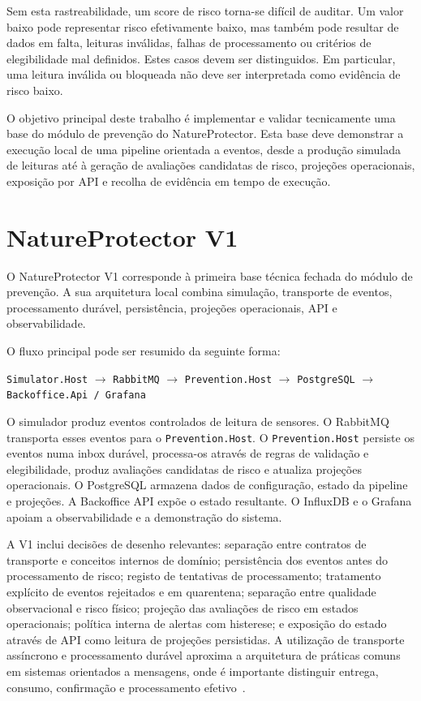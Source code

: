 Sem esta rastreabilidade, um score de risco torna-se difícil de auditar. Um valor baixo pode representar risco efetivamente baixo, mas também pode resultar de dados em falta, leituras inválidas, falhas de processamento ou critérios de elegibilidade mal definidos. Estes casos devem ser distinguidos. Em particular, uma leitura inválida ou bloqueada não deve ser interpretada como evidência de risco baixo.

O objetivo principal deste trabalho é implementar e validar tecnicamente uma base do módulo de prevenção do NatureProtector. Esta base deve demonstrar a execução local de uma pipeline orientada a eventos, desde a produção simulada de leituras até à geração de avaliações candidatas de risco, projeções operacionais, exposição por API e recolha de evidência em tempo de execução.

\section{NatureProtector V1}

O NatureProtector V1 corresponde à primeira base técnica fechada do módulo de prevenção. A sua arquitetura local combina simulação, transporte de eventos, processamento durável, persistência, projeções operacionais, API e observabilidade.

O fluxo principal pode ser resumido da seguinte forma:

\begin{center}
\texttt{Simulator.Host} $\rightarrow$ \texttt{RabbitMQ} $\rightarrow$ \texttt{Prevention.Host} $\rightarrow$ \texttt{PostgreSQL} $\rightarrow$ \texttt{Backoffice.Api / Grafana}
\end{center}

O simulador produz eventos controlados de leitura de sensores. O RabbitMQ transporta esses eventos para o \texttt{Prevention.Host}. O \texttt{Prevention.Host} persiste os eventos numa inbox durável, processa-os através de regras de validação e elegibilidade, produz avaliações candidatas de risco e atualiza projeções operacionais. O PostgreSQL armazena dados de configuração, estado da pipeline e projeções. A Backoffice API expõe o estado resultante. O InfluxDB e o Grafana apoiam a observabilidade e a demonstração do sistema.

A V1 inclui decisões de desenho relevantes: separação entre contratos de transporte e conceitos internos de domínio; persistência dos eventos antes do processamento de risco; registo de tentativas de processamento; tratamento explícito de eventos rejeitados e em quarentena; separação entre qualidade observacional e risco físico; projeção das avaliações de risco em estados operacionais; política interna de alertas com histerese; e exposição do estado através de API como leitura de projeções persistidas. A utilização de transporte assíncrono e processamento durável aproxima a arquitetura de práticas comuns em sistemas orientados a mensagens, onde é importante distinguir entrega, consumo, confirmação e processamento efetivo~\citep{rabbitmq_amqp_model,rabbitmq_consumer_acknowledgements,richardson_idempotent_consumer}.

